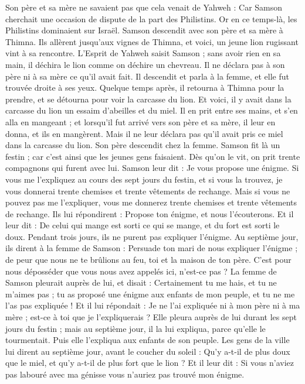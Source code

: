 \begin{multicols}{2}
Son père et sa mère ne savaient pas que cela venait de Yahweh : Car Samson cherchait une occasion de dispute de la part des Philistins. Or en ce temps-là, les Philistins dominaient sur Israël.
Samson descendit avec son père et sa mère à Thimna. Ils allèrent jusqu'aux vignes de Thimna, et voici, un jeune lion rugissant vint à sa rencontre.
L'Esprit de Yahweh saisit Samson ; sans avoir rien en sa main, il déchira le lion comme on déchire un chevreau. Il ne déclara pas à son père ni à sa mère ce qu'il avait fait.
Il descendit et parla à la femme, et elle fut trouvée droite à ses yeux.
Quelque temps après, il retourna à Thimna pour la prendre, et se détourna pour voir la carcasse du lion. Et voici, il y avait dans la carcasse du lion un essaim d'abeilles et du miel.
Il en prit entre ses mains, et s'en alla en mangeant ; et lorsqu'il fut arrivé vers son père et sa mère, il leur en donna, et ils en mangèrent. Mais il ne leur déclara pas qu'il avait pris ce miel dans la carcasse du lion.
Son père descendit chez la femme. Samson fit là un festin ; car c'est ainsi que les jeunes gens faisaient.
Dès qu'on le vit, on prit trente compagnons qui furent avec lui.
Samson leur dit : Je vous propose une énigme. Si vous me l'expliquez au cours des sept jours du festin, et si vous la trouvez, je vous donnerai trente chemises et trente vêtements de rechange.
Mais si vous ne pouvez pas me l'expliquer, vous me donnerez trente chemises et trente vêtements de rechange. Ils lui répondirent : Propose ton énigme, et nous l'écouterons.
Et il leur dit : De celui qui mange est sorti ce qui se mange, et du fort est sorti le doux. Pendant trois jours, ils ne purent pas expliquer l'énigme.
Au septième jour, ils dirent à la femme de Samson : Persuade ton mari de nous expliquer l'énigme ; de peur que nous ne te brûlions au feu, toi et la maison de ton père. C'est pour nous déposséder que vous nous avez appelés ici, n'est-ce pas ?
La femme de Samson pleurait auprès de lui, et disait : Certainement tu me hais, et tu ne m'aimes pas ; tu as proposé une énigme aux enfants de mon peuple, et tu ne me l'as pas expliquée ! Et il lui répondait : Je ne l'ai expliquée ni à mon père ni à ma mère ; est-ce à toi que je l'expliquerais ?
Elle pleura auprès de lui durant les sept jours du festin ; mais au septième jour, il la lui expliqua, parce qu'elle le tourmentait. Puis elle l'expliqua aux enfants de son peuple.
Les gens de la ville lui dirent au septième jour, avant le coucher du soleil : Qu'y a-t-il de plus doux que le miel, et qu'y a-t-il de plus fort que le lion ? Et il leur dit : Si vous n'aviez pas labouré avec ma génisse vous n'auriez pas trouvé mon énigme.

\end{multicols}
